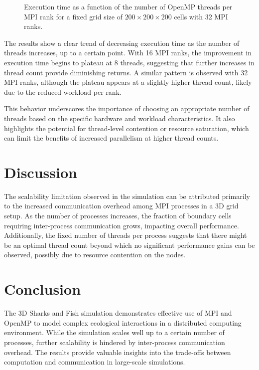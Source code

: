 \documentclass[conference,compsoc]{IEEEtran}
\begin{document}
\begin{figure}[htbp]
    \centering
    \caption{Execution time as a function of the number of OpenMP threads per MPI rank for a fixed grid size of $200 \times 200 \times 200$ cells with 32 MPI ranks.}
    \label{fig:threads_32}
\end{figure}

The results show a clear trend of decreasing execution time as the number of threads increases, up to a certain point. With 16 MPI ranks, the improvement in execution time begins to plateau at 8 threads, suggesting that further increases in thread count provide diminishing returns. A similar pattern is observed with 32 MPI ranks, although the plateau appears at a slightly higher thread count, likely due to the reduced workload per rank.

This behavior underscores the importance of choosing an appropriate number of threads based on the specific hardware and workload characteristics. It also highlights the potential for thread-level contention or resource saturation, which can limit the benefits of increased parallelism at higher thread counts.

\section{Discussion}
The scalability limitation observed in the simulation can be attributed primarily to the increased communication overhead among MPI processes in a 3D grid setup. As the number of processes increases, the fraction of boundary cells requiring inter-process communication grows, impacting overall performance. Additionally, the fixed number of threads per process suggests that there might be an optimal thread count beyond which no significant performance gains can be observed, possibly due to resource contention on the nodes.



\section{Conclusion}
The 3D Sharks and Fish simulation demonstrates effective use of MPI and OpenMP to model complex ecological interactions in a distributed computing environment. While the simulation scales well up to a certain number of processes, further scalability is hindered by inter-process communication overhead. The results provide valuable insights into the trade-offs between computation and communication in large-scale simulations.
\end{document}
